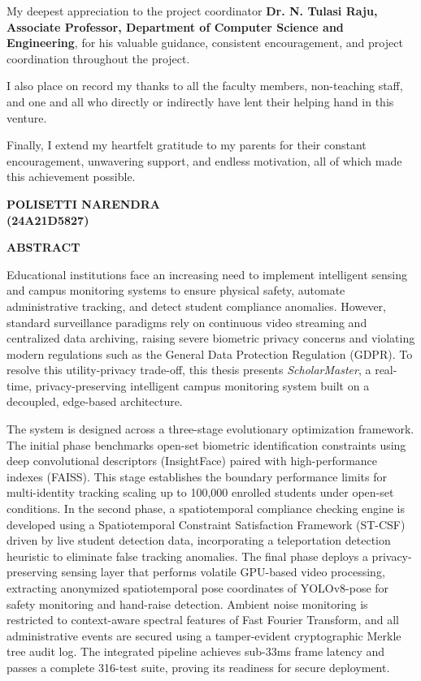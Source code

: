 \documentclass[12pt,a4paper,oneside]{report}
\begin{document}
My deepest appreciation to the project coordinator \textbf{Dr. N. Tulasi Raju, Associate Professor, Department of Computer Science and Engineering}, for his valuable guidance, consistent encouragement, and project coordination throughout the project.

I also place on record my thanks to all the faculty members, non-teaching staff, and one and all who directly or indirectly have lent their helping hand in this venture.

Finally, I extend my heartfelt gratitude to my parents for their constant encouragement, unwavering support, and endless motivation, all of which made this achievement possible.

\vspace{0.25in}
\begin{flushright}
    \textbf{POLISETTI NARENDRA}\\
    \textbf{(24A21D5827)}
\end{flushright}
\endgroup

\newpage
\begin{center}
    \fontsize{14}{16}\bfseries{ABSTRACT}
\end{center}
\vspace{0.2in}
Educational institutions face an increasing need to implement intelligent sensing and campus monitoring systems to ensure physical safety, automate administrative tracking, and detect student compliance anomalies. However, standard surveillance paradigms rely on continuous video streaming and centralized data archiving, raising severe biometric privacy concerns and violating modern regulations such as the General Data Protection Regulation (GDPR). To resolve this utility-privacy trade-off, this thesis presents \textit{ScholarMaster}, a real-time, privacy-preserving intelligent campus monitoring system built on a decoupled, edge-based architecture.

The system is designed across a three-stage evolutionary optimization framework. The initial phase benchmarks open-set biometric identification constraints using deep convolutional descriptors (InsightFace) paired with high-performance indexes (FAISS). This stage establishes the boundary performance limits for multi-identity tracking scaling up to 100,000 enrolled students under open-set conditions. In the second phase, a spatiotemporal compliance checking engine is developed using a Spatiotemporal Constraint Satisfaction Framework (ST-CSF) driven by live student detection data, incorporating a teleportation detection heuristic to eliminate false tracking anomalies. The final phase deploys a privacy-preserving sensing layer that performs volatile GPU-based video processing, extracting anonymized spatiotemporal pose coordinates of YOLOv8-pose for safety monitoring and hand-raise detection. Ambient noise monitoring is restricted to context-aware spectral features of Fast Fourier Transform, and all administrative events are secured using a tamper-evident cryptographic Merkle tree audit log. The integrated pipeline achieves sub-33ms frame latency and passes a complete 316-test suite, proving its readiness for secure deployment.
\end{document}
